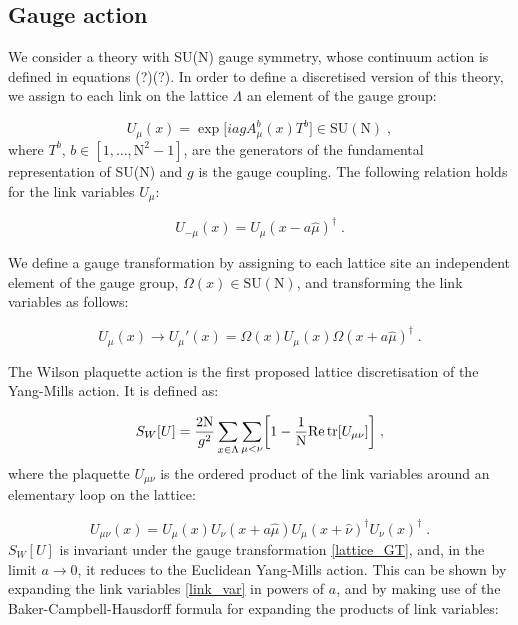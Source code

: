 \subsection{Gauge action}

We consider a theory with SU(N) gauge symmetry, whose continuum action is defined in equations (?)(?).  In order to define a discretised version of this theory, we assign to each link on the lattice $\Lambda$ an element of the gauge group:

\begin{equation}
U_ {\mu}(x) = \exp\biggl[i a  g A^b_{\mu}(x) T^b \biggr] \in \mathrm{SU(N)} \; ,
\label{link_var}
\end{equation}
%
where $T^b$, $b \in  [1, \dots, \mathrm{N}^2 -1]$, are the generators of the fundamental representation  of  SU(N) and $g$ is the gauge coupling. The following relation holds for the link variables $U_{\mu}$:

\begin{equation}
U_{-\mu}(x)  = U_{\mu}(x - a\hat\mu)^{\dagger} \; .
\end{equation}

We define a gauge transformation by assigning to each lattice site an independent element of the gauge group, $\Omega(x) \in \mathrm{SU(N)}$,  and transforming the  link variables as follows:

\begin{equation}
U_ {\mu}(x) \to  U_{\mu}'(x) = \Omega(x) U_{\mu}(x) \Omega(x+  a \hat \mu)^{\dagger} \; .
\label{lattice_GT}
\end{equation}

The  Wilson plaquette action \cite{Wilson:1974sk} is the first proposed lattice discretisation of the  Yang-Mills action. It is defined as:

\begin{equation}
S_W[U] =  \frac{2 \mathrm N}{g^2} \sum_{x \in \Lambda}  \sum_{\mu < \nu} \biggl[  1 - \frac{1}{\mathrm{N}} \mathrm{Re} \tr  [U_{\mu \nu}] \biggr] \; ,
\end{equation}
%
where the plaquette $U_{\mu \nu}$ is the ordered product of the link variables around an elementary loop on the lattice:

\begin{equation}
U_{\mu \nu}(x)  = U_{\mu}(x) U_{\nu}(x + a\hat\mu) U_{\mu}(x+\hat\nu)^{\dagger} U_{\nu}(x) ^{\dagger}   \; .
\label{plaquette}
\end{equation}
%
$S_W[U]$ is invariant under the gauge transformation \ref{lattice_GT}, and, in the limit $a \to 0$, it reduces to the Euclidean Yang-Mills action.
This can be shown by expanding the link variables \ref{link_var} in powers of $a$, and by making use of the Baker-Campbell-Hausdorff formula for expanding the products of link variables:

